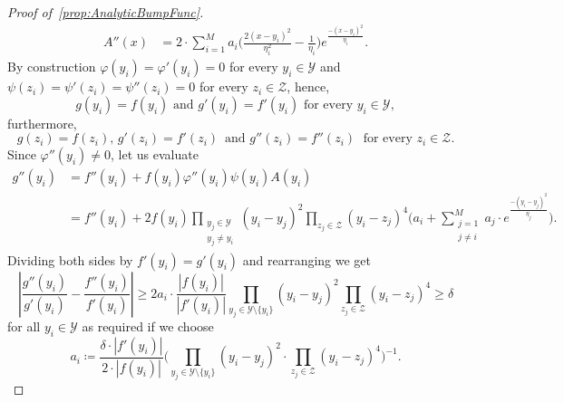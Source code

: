 \documentclass[11pt,a4paper]{article}
\def\cref#1{\ref{#1}}%
\theoremstyle{definition}
\theoremstyle{remark}
\newcommand{\0}{\mathbf{0}}
\numberwithin{equation}{section}
\begin{document}
\begin{proof}[Proof of~\cref{prop:AnalyticBumpFunc}]
\begin{align*}
	A''(x)&= 2\cdot \sum_{i=1}^{M} a_i \Big( \frac{2(x-y_i)^2}{\eta_i^2} -\frac{1}{\eta_i} \Big)
	e^{\frac{-(x-y_i)^2}{\eta_i}}. 
\end{align*}
By construction $\varphi(y_i) = \varphi'(y_i) =0$ for every $ y_i\in\mathcal{Y}$ and $\psi(z_i) =
\psi'(z_i) = \psi''(z_i)=0$ for every $z_i\in\mathcal{Z}$, hence,
\begin{equation*}
	g(y_i)=f(y_i) \text{ and } g'(y_i)=f'(y_i) \text{ for every } y_i\in\mathcal{Y},
\end{equation*}
furthermore,
\begin{equation*}
	g(z_i)=f(z_i),\, g'(z_i)=f'(z_i) \,\text{ and } g''(z_i)=f''(z_i) \;\text{ for every }
	z_i\in\mathcal{Z}.
\end{equation*}
Since $\varphi''(y_i)\neq 0$, let us evaluate
\begin{align*}
	g''(y_i) &= f''(y_i) + f(y_i)\varphi''(y_i)\psi(y_i)A(y_i) \\
	&=  f''(y_i) + 2f(y_i) \prod_{\substack{y_j\in\mathcal{Y}\\ y_j\neq y_i}} (y_i-y_j)^2
	\prod_{z_j\in\mathcal{Z}} (y_i-z_j)^4 \bigg( a_i+ \sum_{\substack{j=1 \\ j\neq i}}^{M}
	a_j\cdot e^{\frac{-(y_i-y_j)^2}{\eta_j}} \bigg).
\end{align*}
Dividing both sides by $f'(y_i)=g'(y_i)$ and rearranging we get
\begin{equation*}
	\left| \frac{g''(y_i)}{g'(y_i)} - \frac{f''(y_i)}{f'(y_i)} \right|\geq 2a_i\cdot
	\frac{|f(y_i)|}{|f'(y_i)|}\prod_{y_j\in\mathcal{Y}\setminus\{y_i\}} (y_i-y_j)^2
	\prod_{z_j\in\mathcal{Z}} (y_i-z_j)^4 \geq \delta
\end{equation*}
for all $y_i\in\mathcal{Y}$ as required if we choose
\begin{equation}\label{eq:a_iChoice}
	a_i \coloneqq \frac{\delta \cdot |f'(y_i)|}{2  \cdot |f(y_i)|}
	\Big(\prod_{y_j\in\mathcal{Y}\setminus\{y_i\}} (y_i - y_j)^2 \cdot \prod_{z_j\in\mathcal{Z}}
	(y_i - z_j)^4 \Big)^{-1}.
\end{equation}


\end{proof}
\end{document}
